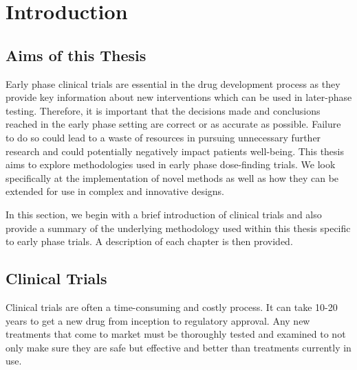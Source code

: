 
\chapter{Introduction} %

\label{Intro} %

\section{Aims of this Thesis}
Early phase clinical trials are essential in the drug development process as they provide key information about new interventions which can be used in later-phase testing. Therefore, it is important that the decisions made and conclusions reached in the early phase setting are correct or as accurate as possible. Failure to do so could lead to a waste of resources in pursuing unnecessary further research and could potentially negatively impact patients well-being. This thesis aims to explore methodologies used in early phase dose-finding trials. We look specifically at the implementation of novel methods as well as how they can be extended for use in complex and innovative designs. 

In this section, we begin with a brief introduction of clinical trials and also provide a summary of the underlying methodology used within this thesis specific to early phase trials. A description of each chapter is then provided. 

\section{Clinical Trials}

Clinical trials are often a time-consuming and costly process. It can take 10-20 years to get a new drug from inception to regulatory approval. Any new treatments that come to market must be thoroughly tested and examined to not only make sure they are safe but effective and better than treatments currently in use.

